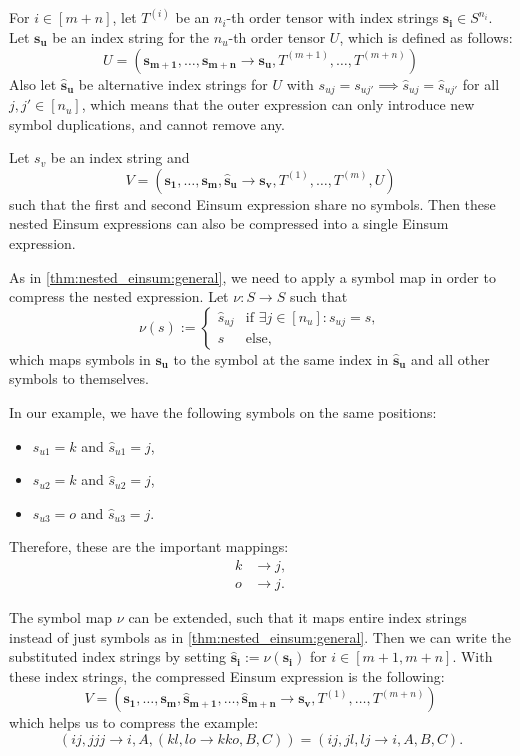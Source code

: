 \begin{theorem}
    \label{thm:nested_einsum:introduce_duplications}

    For $i \in [m + n]$, let $T^{(i)}$ be an $n_i$-th order tensor with index strings $\bm{s_i} \in S^{n_i}$.
    Let $\bm{s_u}$ be an index string for the $n_u$-th order tensor $U$, which is defined as follows:
    $$U = (\bm{s_{m + 1}},\dots,\bm{s_{m + n}} \rightarrow \bm{s_u}, T^{(m + 1)},\dots,T^{(m + n)})$$
    Also let $\bm{\hat{s}_u}$ be alternative index strings for $U$ with $s_{uj} = s_{uj'} \implies \hat{s}_{uj} = \hat{s}_{uj'}$ for all $j, j' \in [n_u]$,
    which means that the outer expression can only introduce new symbol duplications, and cannot remove any.

    Let $s_v$ be an index string and
    $$V = (\bm{s_1},\dots,\bm{s_m}, \bm{\hat{s}_u} \rightarrow \bm{s_v}, T^{(1)},\dots,T^{(m)}, U)$$
    such that the first and second Einsum expression share no symbols.
    Then these nested Einsum expressions can also be compressed into a single Einsum expression.

    As in \cref{thm:nested_einsum:general}, we need to apply a symbol map in order to compress the nested expression.
    Let $\nu: S \rightarrow S$ such that
    $$\nu(s) := \begin{cases}
            \hat{s}_{uj} & \text{if $\exists j \in [n_u]: s_{uj} = s$}, \\
            s            & \text{else},
        \end{cases}$$
    which maps symbols in $\bm{s_u}$ to the symbol at the same index in $\bm{\hat{s}_u}$ and all other symbols to themselves.

    In our example, we have the following symbols on the same positions:
    \begin{itemize}
        \item $s_{u1} = k$ and $\hat{s}_{u1} = j$,
        \item $s_{u2} = k$ and $\hat{s}_{u2} = j$,
        \item $s_{u3} = o$ and $\hat{s}_{u3} = j$.
    \end{itemize}
    Therefore, these are the important mappings:
    \begin{align*}
        k & \rightarrow j, \\
        o & \rightarrow j.
    \end{align*}

    The symbol map $\nu$ can be extended, such that it maps entire index strings instead of just symbols as in \cref{thm:nested_einsum:general}.
    Then we can write the substituted index strings by setting $\bm{\hat{s}_i} := \nu(\bm{s_i})$ for $i \in [m + 1, m + n]$.
    With these index strings, the compressed Einsum expression is the following:
    $$V = (\bm{s_1},\dots,\bm{s_m}, \bm{\hat{s}_{m + 1}}, \dots, \bm{\hat{s}_{m + n}} \rightarrow \bm{s_v}, T^{(1)},\dots,T^{(m + n)})$$
    which helps us to compress the example:
    $$(ij, jjj \rightarrow i, A, (kl, lo \rightarrow kko, B, C)) = (ij, jl, lj \rightarrow i, A, B, C).$$
\end{theorem}

